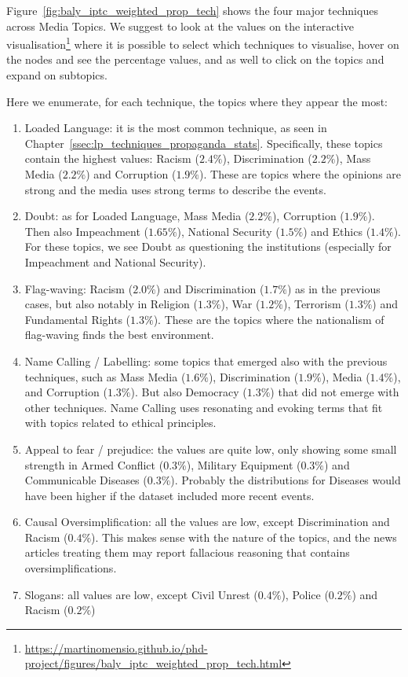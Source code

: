 Figure~\ref{fig:baly_iptc_weighted_prop_tech} shows the four major techniques across Media Topics. We suggest to look at the values on the interactive visualisation\footnote{\url{https://martinomensio.github.io/phd-project/figures/baly_iptc_weighted_prop_tech.html}} where it is possible to select which techniques to visualise, hover on the nodes and see the percentage values, and as well to click on the topics and expand on subtopics.

Here we enumerate, for each technique, the topics where they appear the most:

\begin{enumerate}
    \item Loaded Language: it is the most common technique, as seen in Chapter~\ref{ssec:lp_techniques_propaganda_stats}. Specifically, these topics contain the highest values: Racism ($2.4\%$), Discrimination ($2.2\%$), Mass Media ($2.2\%$) and Corruption ($1.9\%$). These are topics where the opinions are strong and the media uses strong terms to describe the events.
    \item Doubt: as for Loaded Language, Mass Media ($2.2\%$), Corruption ($1.9\%$). Then also Impeachment ($1.65\%$), National Security ($1.5\%$) and Ethics ($1.4\%$). For these topics, we see Doubt as questioning the institutions (especially for Impeachment and National Security).
    \item Flag-waving: Racism ($2.0\%$) and Discrimination ($1.7\%$) as in the previous cases, but also notably in Religion ($1.3\%$), War ($1.2\%$), Terrorism ($1.3\%$) and Fundamental Rights ($1.3\%$). These are the topics where the nationalism of flag-waving finds the best environment.
    \item Name Calling / Labelling: some topics that emerged also with the previous techniques, such as Mass Media ($1.6\%$), Discrimination ($1.9\%$), Media ($1.4\%$), and Corruption ($1.3\%$). But also Democracy ($1.3\%$) that did not emerge with other techniques. Name Calling uses resonating and evoking terms that fit with topics related to ethical principles.
    \item Appeal to fear / prejudice: the values are quite low, only showing some small strength in Armed Conflict ($0.3\%$), Military Equipment ($0.3\%$) and Communicable Diseases ($0.3\%$). Probably the distributions for Diseases would have been higher if the dataset included more recent events.
    \item Causal Oversimplification: all the values are low, except Discrimination and Racism ($0.4\%$). This makes sense with the nature of the topics, and the news articles treating them may report fallacious reasoning that contains oversimplifications.
    \item Slogans: all values are low, except Civil Unrest ($0.4\%$), Police ($0.2\%$) and Racism ($0.2\%$)
\end{enumerate}


